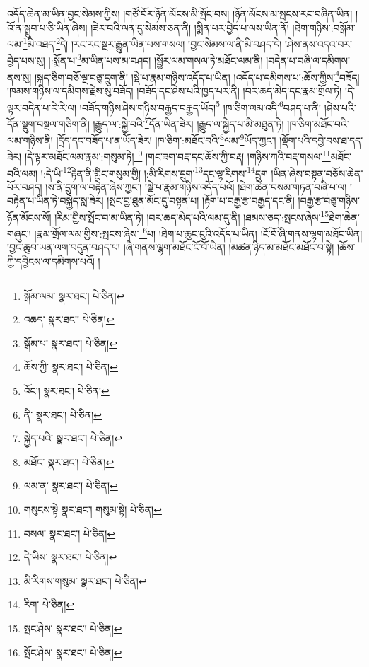 འདོད་ཆེན་མ་ཡིན་བྱང་སེམས་ཀྱིས། །གཙོ་བོར་ཉོན་མོངས་མི་སྤོང་བས། །ཉོན་མོངས་མ་སྤངས་རང་བཞིན་ཡིན། །འོ་ན་སྒྲུབ་པ་ཅི་ཡིན་ཞེས། །ཟེར་བའི་ལན་དུ་སེམས་ཅན་ནི། །སྨིན་པར་བྱེད་པ་ལས་ཡིན་ནོ། །ཐེག་གཉིས་:བསྒོམ་ལམ་\footnote{སྒོམ་ལམ་  སྣར་ཐང་།  པེ་ཅིན། }མི་འཐད་\footnote{འཆད་  སྣར་ཐང་།  པེ་ཅིན། }དེ། །རང་རང་སྔར་རྒྱུན་ཡིན་པས་གསལ། །བྱང་སེམས་ལ་ནི་མི་བཤད་དེ། །ཤེས་ནས་འདའ་བར་བྱེད་པས་སུ། །:སྨོན་པ་\footnote{སྒོམ་པ་  སྣར་ཐང་།  པེ་ཅིན། }མ་ཡིན་པས་མ་བཤད། །སྦྱོར་ལམ་གསལ་ཏེ་མཐོང་ལམ་ནི། །བདེན་པ་བཞི་ལ་དམིགས་ནས་སུ། །སྐད་ཅིག་བཅོ་ལྔ་བཅུ་དྲུག་ནི། །སྡེ་པ་རྣམ་གཉིས་འདོད་པ་ཡིན། །འདོད་པ་དམིགས་པ་:ཆོས་ཀྱིས་\footnote{ཆོས་ཀྱི་  སྣར་ཐང་།  པེ་ཅིན། }བཟོད། །ཁམས་གཉིས་ལ་དམིགས་རྗེས་སུ་བཟོད། །བཟོད་དང་ཤེས་པའི་ཁྱད་པར་ནི། །བར་ཆད་མེད་དང་རྣམ་གྲོལ་ཏེ། །དེ་ལྟར་བདེན་པ་རེ་རེ་ལ། །བཟོད་གཉིས་ཤེས་གཉིས་བརྒྱད་བརྒྱད་ཡོད།\footnote{འོང་།  སྣར་ཐང་།  པེ་ཅིན། } །ཁ་ཅིག་ལམ་འདི་\footnote{ནི་  སྣར་ཐང་།  པེ་ཅིན། }བཤད་པ་ནི། །ཤེས་པའི་དོན་སྡུག་བསྔལ་གཅིག་ནི། །རྒྱུད་ལ་:སྐྱེ་བའི་\footnote{སྐྱེད་པའི་  སྣར་ཐང་།  པེ་ཅིན། }དོན་ཡིན་ཟེར། །རྒྱུད་ལ་སྐྱེད་པ་མི་མཐུན་ཏེ། །ཁ་ཅིག་མཐོང་བའི་ལམ་གཉིས་ནི། །དྲོད་དང་བཟོད་པ་ན་ཡོད་ཟེར། །ཁ་ཅིག་:མཐོང་བའི་\footnote{མཐོང་  སྣར་ཐང་།  པེ་ཅིན། }ལམ་\footnote{ལམ་ན་  སྣར་ཐང་།  པེ་ཅིན། }ཡོད་ཀྱང་། །ལྡོག་པའི་དབྱེ་བས་ཐ་དད་ཟེར། །དེ་ལྟར་མཐོང་ལམ་རྣམ་:གསུམ་ཏེ།\footnote{གསུངས་སྟེ  སྣར་ཐང་། གསུམ་སྟེ།  པེ་ཅིན། } །གང་ཟག་བརྡ་དང་ཆོས་ཀྱི་བརྡ། །གཉིས་ཀའི་བརྡ་གསལ་\footnote{བསལ་  སྣར་ཐང་།  པེ་ཅིན། }མཐོང་བའི་ལམ། །:དེ་ཡི་\footnote{དེ་ཡིས་  སྣར་ཐང་།  པེ་ཅིན། }རྟེན་ནི་གླིང་གསུམ་གྱི། །:མི་རིགས་དྲུག་\footnote{མི་རིགས་གསུམ་  སྣར་ཐང་།  པེ་ཅིན། }དང་ལྷ་རིགས་\footnote{རིག་  པེ་ཅིན། }དྲུག །ཡིན་ཞེས་བསྟན་བཅོས་ཆེན་པོར་བཤད། །ས་ནི་དྲུག་ལ་བརྟེན་ཞེས་ཀྱང་། །སྡེ་པ་རྣམ་གཉིས་འདོད་པའོ། །ཐེག་ཆེན་བསམ་གཏན་བཞི་པ་ལ། །བརྟེན་པ་ཡིན་ཏེ་བསྐྱེད་སླ་ཟེར། །སྤང་བྱ་ཐུན་མོང་དུ་བསྟན་པ། །རྟོག་པ་བརྒྱ་རྩ་བརྒྱད་དང་ནི། །བརྒྱ་རྩ་བཅུ་གཉིས་ཉོན་མོངས་སོ། །རིམ་གྱིས་སྤོང་བ་མ་ཡིན་ཏེ། །བར་ཆད་མེད་པའི་ལམ་དུ་ནི། །ཐམས་ཅད་:སྤངས་ཞེས་\footnote{སྤང་ཤེས་  སྣར་ཐང་།  པེ་ཅིན། }ཐེག་ཆེན་གཞུང་། །རྣམ་གྲོལ་ལམ་གྱིས་:སྤངས་ཞེས་\footnote{སྤོང་ཤེས་  སྣར་ཐང་།  པེ་ཅིན། }པ། །ཐེག་པ་ཆུང་ངུའི་འདོད་པ་ཡིན། །ངོ་བོ་ཞི་གནས་ལྷག་མཐོང་ཡིན། །བྱང་ཆུབ་ཡན་ལག་བདུན་བཤད་པ། །ཞི་གནས་ལྷག་མཐོང་ངོ་བོ་ཡིན། །མཚན་ཉིད་མ་མཐོང་མཐོང་བ་སྟེ། །ཆོས་ཀྱི་དབྱིངས་ལ་དམིགས་པའོ། །
